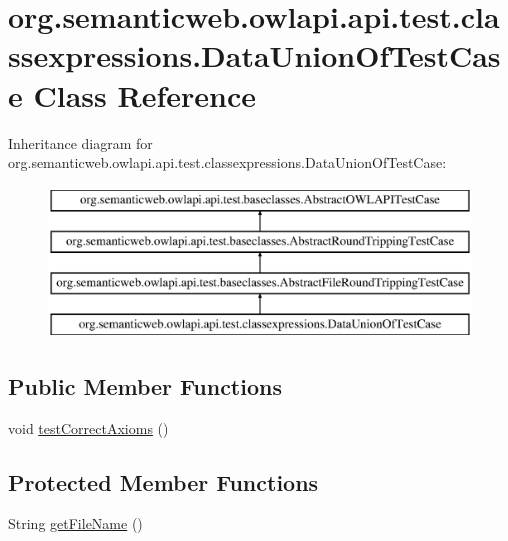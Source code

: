 \hypertarget{classorg_1_1semanticweb_1_1owlapi_1_1api_1_1test_1_1classexpressions_1_1_data_union_of_test_case}{\section{org.\-semanticweb.\-owlapi.\-api.\-test.\-classexpressions.\-Data\-Union\-Of\-Test\-Case Class Reference}
\label{classorg_1_1semanticweb_1_1owlapi_1_1api_1_1test_1_1classexpressions_1_1_data_union_of_test_case}
}
Inheritance diagram for org.\-semanticweb.\-owlapi.\-api.\-test.\-classexpressions.\-Data\-Union\-Of\-Test\-Case\-:\begin{figure}[H]
\begin{center}
\leavevmode
\includegraphics[height=4.000000cm]{classorg_1_1semanticweb_1_1owlapi_1_1api_1_1test_1_1classexpressions_1_1_data_union_of_test_case}
\end{center}
\end{figure}
\subsection*{Public Member Functions}
\begin{DoxyCompactItemize}
\item 
void \hyperlink{classorg_1_1semanticweb_1_1owlapi_1_1api_1_1test_1_1classexpressions_1_1_data_union_of_test_case_a09efdcb7ab8d2ce76dc2afd421f2746e}{test\-Correct\-Axioms} ()
\end{DoxyCompactItemize}
\subsection*{Protected Member Functions}
\begin{DoxyCompactItemize}
\item 
String \hyperlink{classorg_1_1semanticweb_1_1owlapi_1_1api_1_1test_1_1classexpressions_1_1_data_union_of_test_case_a04b4b4efeb9090991034384470e8ca61}{get\-File\-Name} ()
\end{DoxyCompactItemize}



